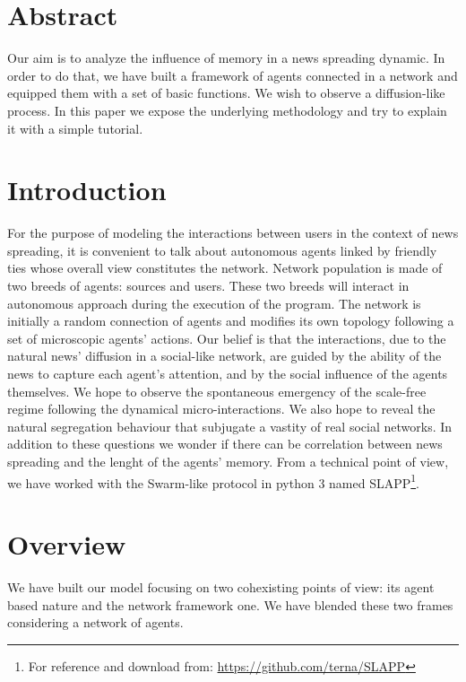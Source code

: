 \section*{Abstract}
Our aim is to analyze the influence of memory in a news spreading dynamic. In order to do that, we have built a framework of agents 
connected in a network and equipped them with a set of basic functions. We wish to observe a diffusion-like process.
In this paper we expose the underlying methodology and try to explain it with a simple tutorial.
\section{Introduction}

For the purpose of modeling the interactions between users in the context of news spreading, it is convenient to talk about autonomous agents
linked by friendly ties whose overall view constitutes the network.
Network population is made of two breeds of agents: sources and users. These two breeds will interact
in autonomous approach during the execution of the program.
The network is initially a random connection of agents and modifies its own topology following a set of microscopic agents' actions.
Our belief is that the interactions, due to the natural news' diffusion in a social-like network, are guided by the ability of the news
to capture each agent's attention, and by the social influence of the agents themselves.
We hope to observe the spontaneous emergency of the scale-free regime following the dynamical micro-interactions. We also hope to reveal 
the natural segregation behaviour that subjugate a vastity of real social networks.
In addition to these questions we wonder if there can be correlation between news spreading and the lenght of the agents' memory.
From a technical point of view, we have worked with the Swarm-like protocol in python 3 named SLAPP\footnote{For reference and download from: \url{https://github.com/terna/SLAPP}}.

\section{Overview}
We have built our model focusing on two cohexisting points of view: its agent based nature and the network framework one. 
We have blended these two frames considering a network of agents. 
